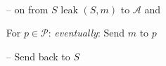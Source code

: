 \begin{minipage}{0.5\textwidth}
\begin{bbox}[title={Functionality $\F_\m{Multicast}(S, \mathcal{P})$}]
~
\begin{itemize}[leftmargin=*]
\item[--] on  from $S$ leak $(S,m)$ to $\mathcal{A}$ and

\qquad \qquad For $p \in \mathcal{P}$: \emph{eventually}: Send $m$ to $p$

\item[--] Send  back to $S$
\end{itemize}
\end{bbox}
\end{minipage}
